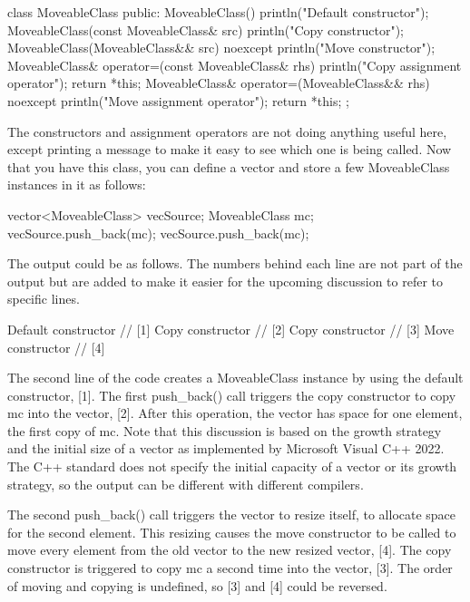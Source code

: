\begin{cpp}
class MoveableClass
{
    public:
        MoveableClass() {
            println("Default constructor");
        }
        MoveableClass(const MoveableClass& src) {
            println("Copy constructor");
        }
        MoveableClass(MoveableClass&& src) noexcept {
            println("Move constructor");
        }
        MoveableClass& operator=(const MoveableClass& rhs) {
            println("Copy assignment operator");
            return *this;
        }
        MoveableClass& operator=(MoveableClass&& rhs) noexcept {
            println("Move assignment operator");
            return *this;
        }
};
\end{cpp}

The constructors and assignment operators are not doing anything useful here, except printing a message to make it easy to see which one is being called. Now that you have this class, you can define a vector and store a few MoveableClass instances in it as follows:

\begin{cpp}
vector<MoveableClass> vecSource;
MoveableClass mc;
vecSource.push_back(mc);
vecSource.push_back(mc);
\end{cpp}

The output could be as follows. The numbers behind each line are not part of the output but are added to make it easier for the upcoming discussion to refer to specific lines.

\begin{cpp}
Default constructor // [1]
Copy constructor // [2]
Copy constructor // [3]
Move constructor // [4]
\end{cpp}

The second line of the code creates a MoveableClass instance by using the default constructor, [1]. The first push\_back() call triggers the copy constructor to copy mc into the vector, [2]. After this operation, the vector has space for one element, the first copy of mc. Note that this discussion is based on the growth strategy and the initial size of a vector as implemented by Microsoft Visual C++ 2022. The C++ standard does not specify the initial capacity of a vector or its growth strategy, so the output can be different with different compilers.

The second push\_back() call triggers the vector to resize itself, to allocate space for the second element. This resizing causes the move constructor to be called to move every element from the old vector to the new resized vector, [4]. The copy constructor is triggered to copy mc a second time into the vector, [3]. The order of moving and copying is undefined, so [3] and [4] could be reversed.

